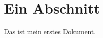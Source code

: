 \documentclass{scrartcl}
\begin{document}
\section{Ein Abschnitt}
Das ist mein erstes Dokument.
\end{document}
